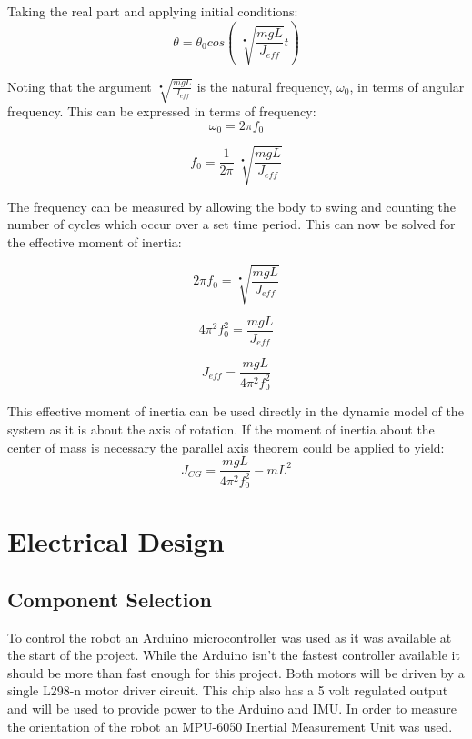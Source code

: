 \documentclass{article}
\begin{document}
	Taking the real part and applying initial conditions:
	\begin{equation}
		\label{fig:PhysicalPendRealSolution}
		\theta = \theta_0 cos(\; \sqrt[•]{\frac{mgL}{J_{eff}}}t)
	\end{equation}

	
	Noting that the argument $\sqrt[•]{\frac{mgL}{J_{eff}}}$ is the natural frequency, $\omega_0$, in terms of angular frequency. This can be expressed in terms of frequency:
	$$\omega_0 = 2\pi f_0$$
	
	$$f_0 = \frac{1}{2\pi} \; \sqrt[•]{\frac{mgL}{J_{eff}}}$$
	
	The frequency can be measured by allowing the body to swing and counting the number of cycles which occur over a set time period. This can now be solved for the effective moment of inertia:
	
	$$2\pi f_0 = \sqrt[•]{\frac{mgL}{J_{eff}}}$$
	
	$$4\pi^2 f_0^2 = \frac{mgL}{J_{eff}}$$
	
	\begin{equation}
		\label{eqn:Body2EffectiveMomentOfInertia}
		J_{eff} = \frac{mgL}{4\pi^2 f_0^2}
	\end{equation}
	
	This effective moment of inertia can be used directly in the dynamic model of the system as it is about the axis of rotation. If the moment of inertia about the center of mass is necessary the parallel axis theorem could be applied to yield:
	$$J_{CG} = \frac{mgL}{4\pi^2 f_0^2} - mL^2$$ 

\section{Electrical Design}
	\subsection{Component Selection}
	To control the robot an Arduino microcontroller was used as it was available at the start of the project. While the Arduino isn't the fastest controller available it should be more than fast enough for this project.
	Both motors will be driven by a single L298-n motor driver circuit. This chip also has a 5 volt regulated output and will be used to provide power to the Arduino and IMU. 
	In order to measure the orientation of the robot an MPU-6050 Inertial Measurement Unit was used.
	
\end{document}
